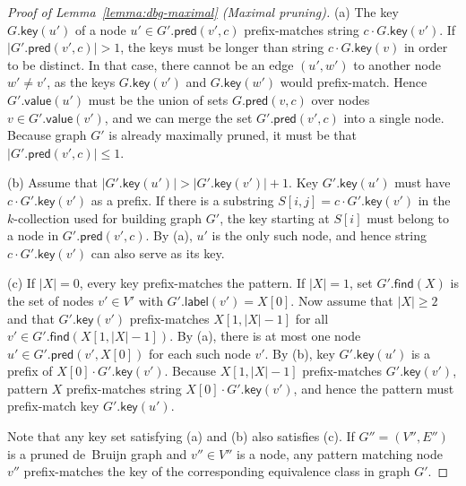 \documentclass[a4paper,UKenglish]{lipics-v2016}
\newcommand{\abs}[1]{\ensuremath{\lvert #1 \rvert}}
\newcommand{\find}{\ensuremath{\mathsf{find}}}
\newcommand{\glabel}{\ensuremath{\mathsf{label}}}
\newcommand{\gpred}{\ensuremath{\mathsf{pred}}}
\newcommand{\gkey}{\ensuremath{\mathsf{key}}}
\newcommand{\gvalue}{\ensuremath{\mathsf{value}}}
\newcommand{\kcollection}[1]{$#1$\nobreakdash-collection}
\begin{document}
\begin{proof}[Proof of Lemma~\ref{lemma:dbg-maximal} (Maximal pruning)]
(a) The key $G.\gkey(u')$ of a node $u' \in G'.\gpred(v', c)$ prefix-matches string $c \cdot G.\gkey(v')$. If $\abs{G'.\gpred(v', c)} > 1$, the keys must be longer than string $c \cdot G.\gkey(v)$ in order to be distinct. In that case, there cannot be an edge $(u', w')$ to another node $w' \ne v'$, as the keys $G.\gkey(v')$ and $G.\gkey(w')$ would prefix-match. Hence $G'.\gvalue(u')$ must be the union of sets $G.\gpred(v, c)$ over nodes $v \in G'.\gvalue(v')$, and we can merge the set $G'.\gpred(v', c)$ into a single node. Because graph $G'$ is already maximally pruned, it must be that $\abs{G'.\gpred(v', c)} \le 1$.

(b) Assume that $\abs{G'.\gkey(u')} > \abs{G'.\gkey(v')}+1$. Key $G'.\gkey(u')$ must have $c \cdot G'.\gkey(v')$ as a prefix. If there is a substring $S[i,j] = c \cdot G'.\gkey(v')$ in the \kcollection{k} used for building graph $G'$, the key starting at $S[i]$ must belong to a node in $G'.\gpred(v', c)$. By (a), $u'$ is the only such node, and hence string $c \cdot G'.\gkey(v')$ can also serve as its key.

(c) If $\abs{X} = 0$, every key prefix-matches the pattern. If $\abs{X} = 1$, set $G'.\find(X)$ is the set of nodes $v' \in V'$ with $G'.\glabel(v') = X[0]$. Now assume that $\abs{X} \ge 2$ and that $G'.\gkey(v')$ prefix-matches $X[1, \abs{X}-1]$ for all $v' \in G'.\find(X[1, \abs{X}-1])$. By (a), there is at most one node $u' \in G'.\gpred(v', X[0])$ for each such node $v'$. By (b), key $G'.\gkey(u')$ is a prefix of $X[0] \cdot G'.\gkey(v')$. Because $X[1, \abs{X}-1]$ prefix-matches $G'.\gkey(v')$, pattern $X$ prefix-matches string $X[0] \cdot G'.\gkey(v')$, and hence the pattern must prefix-match key $G'.\gkey(u')$.

Note that any key set satisfying (a) and (b) also satisfies (c). If $G'' = (V'', E'')$ is a pruned de~Bruijn graph and $v'' \in V''$ is a node, any pattern matching node $v''$ prefix-matches the key of the corresponding equivalence class in graph $G'$.
\end{proof}
\end{document}
